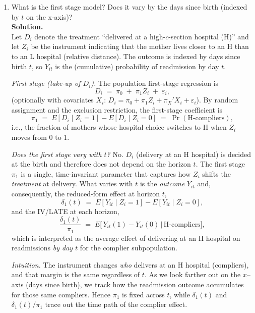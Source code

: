 \documentclass[12pt]{article}
\begin{document}
\begin{enumerate}[label=\textbf{(\alph*)}, leftmargin=1.5em]
  \item What is the first stage model? Does it vary by the days since birth (indexed by $t$ on the x-axis)?\\[0.5em]
  
  \textbf{Solution.} \\
  Let $D_i$ denote the treatment “delivered at a high-$c$-section hospital (H)” and let $Z_i$ be the instrument indicating that the mother lives closer to an H than to an L hospital
  (relative distance). The outcome is indexed by days since birth $t$, so $Y_{it}$ is the (cumulative)
  probability of readmission by day $t$.

  \medskip
  \emph{First stage (take-up of $D_i$).}
  The population first-stage regression is
  \[
  D_i \;=\; \pi_0 \;+\; \pi_1 Z_i \;+\; \varepsilon_i,
  \]
  (optionally with covariates $X_i$: $D_i=\pi_0+\pi_1 Z_i+\pi_X'X_i+\varepsilon_i$).
  By random assignment and the exclusion restriction, the first-stage coefficient is
  \[
  \pi_1 \;=\; E[D_i\mid Z_i=1]-E[D_i\mid Z_i=0]
  \;=\; \Pr(\text{H-compliers}),
  \]
  i.e., the fraction of mothers whose hospital choice switches to H when $Z_i$ moves from $0$ to $1$.

  \medskip
  \emph{Does the first stage vary with $t$?}
  No. $D_i$ (delivery at an H hospital) is decided at the birth and therefore does not depend on
  the horizon $t$. The first stage $\pi_1$ is a single, time-invariant parameter that captures how
  $Z_i$ shifts the \emph{treatment} at delivery. What varies with $t$ is the \emph{outcome} $Y_{it}$ and,
  consequently, the reduced-form effect at horizon $t$,
  \[
  \delta_1(t)\;=\;E[Y_{it}\mid Z_i=1]-E[Y_{it}\mid Z_i=0],
  \]
  and the IV/LATE at each horizon,
  \[
  \frac{\delta_1(t)}{\pi_1}
  \;=\; E\!\big[\,Y_{it}(1)-Y_{it}(0)\,\big|\,\text{H-compliers}\big],
  \]
  which is interpreted as the average effect of delivering at an H hospital on readmissions
  \emph{by day $t$} for the complier subpopulation.

  \medskip
  \emph{Intuition.}
  The instrument changes \emph{who} delivers at an H hospital (compliers), and that margin is the
  same regardless of $t$. As we look farther out on the $x$–axis (days since birth), we track how
  the readmission outcome accumulates for those same compliers. Hence $\pi_1$ is fixed across $t$,
  while $\delta_1(t)$ and $\delta_1(t)/\pi_1$ trace out the time path of the complier effect.


\end{enumerate}
\end{document}
